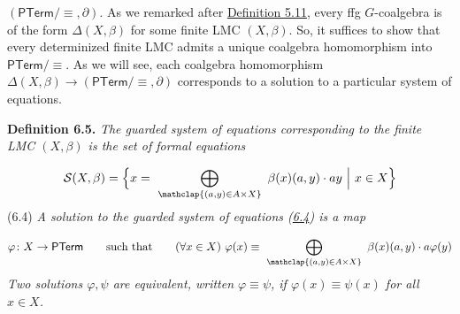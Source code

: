 \documentclass[11pt,a4paper]{amsart}
\begin{document}
\hypertarget{html:S6.SSx1.p1.m2}{}\({(\mathsf{PTerm}/{\equiv},\partial)}\). As we remarked after \hyperlink{html:S5.Thmtheorem11}{Definition 5.11}, every ffg %
\hypertarget{html:S6.SSx1.p1.m3}{}\({G}\)-coalgebra is of the form %
\hypertarget{html:S6.SSx1.p1.m4}{}\({\Delta(X,\beta)}\) for some finite LMC %
\hypertarget{html:S6.SSx1.p1.m5}{}\({(X,\beta)}\). So, it suffices to show that every determinized finite LMC admits a unique coalgebra homomorphism into %
\hypertarget{html:S6.SSx1.p1.m6}{}\({\mathsf{PTerm}/{\equiv}}\). As we will see, each coalgebra homomorphism %
\hypertarget{html:S6.SSx1.p1.m7}{}\({\Delta(X,\beta)\to(\mathsf{PTerm}/{\equiv},\partial)}\) corresponds to a solution to a particular system of equations.
\par\medskip
\hypertarget{html:S6.Thmtheorem5}{} \par\noindent\textbf{\textbf{Definition 6.5}\textbf{.}}\quad  %
\hypertarget{html:S6.Thmtheorem5.p1}{} \emph{The \emph{guarded system of equations} corresponding to the finite LMC %
\hypertarget{html:S6.Thmtheorem5.p1.m1}{}\({(X,\beta)}\) is the set of formal equations}
\par\medskip
\hypertarget{html:S6.E4}{}   %
\hypertarget{html:S6.E4.m1}{}\[\mathcal{S}(X,\beta)=\Big{\{}x=\leavevmode\nobreak\ \bigoplus_{\mathclap{(a,y)\in A\times X}}\leavevmode\nobreak\ \beta(x)(a,y)\cdot ay\leavevmode\nobreak\ \Big{|}\leavevmode\nobreak\ x\in X\Big{\}}\]  (6.4)   \emph{A \emph{solution} to the guarded system of equations (\hyperlink{html:S6.E4}{6.4}) is a map}
\par\medskip
\hypertarget{html:S6.Ex2}{}   %
\hypertarget{html:S6.Ex2.m1}{}\[\varphi\colon X\to\mathsf{PTerm}\qquad\text{such that}\qquad(\forall x\in X)\leavevmode\nobreak\ \varphi(x)\equiv\leavevmode\nobreak\ \bigoplus_{\mathclap{(a,y)\in A\times X}}\leavevmode\nobreak\ \beta(x)(a,y)\cdot a\varphi(y)\]    \emph{Two solutions %
\hypertarget{html:S6.Thmtheorem5.p1.m2}{}\({\varphi,\psi}\) are \emph{equivalent}, written %
\hypertarget{html:S6.Thmtheorem5.p1.m3}{}\({\varphi\equiv\psi}\), if %
\hypertarget{html:S6.Thmtheorem5.p1.m4}{}\({\varphi(x)\equiv\psi(x)}\) for all %
\hypertarget{html:S6.Thmtheorem5.p1.m5}{}\({x\in X}\).}
\end{document}
